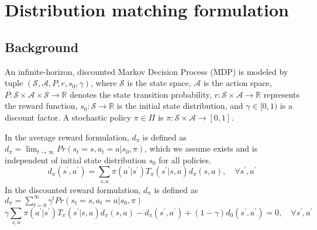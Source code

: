 \section{Distribution matching formulation}

\subsection{Background}
An infinite-horizon, discounted Markov Decision Process (MDP) is modeled by tuple $(\mathcal{S} , \mathcal{A}, P, r , s_0, \gamma)$, where $\mathcal{S}$ is the state space, $\mathcal{A}$ is the action space, $P:\mathcal{S}\times\mathcal{A}\times\mathcal{S}\rightarrow \mathbb{R}$ denotes the state transition probability, $r:\mathcal{S}\times\mathcal{A}\rightarrow\mathbb{R}$ represents the reward function, $s_0:\mathcal{S} \rightarrow\mathbb{R}$ is the initial state distribution, and $\gamma\in[0, 1)$ is a discount factor.
A stochastic policy $\pi\in\Pi$ is $\pi: \mathcal{S}\times\mathcal{A}\rightarrow [0, 1]$. 


In the average reward formulation, $d_\pi$ is defined as $d_{\pi}=\lim_{t\rightarrow\infty}Pr(s_t=s, a_t=a|s_0, \pi)$, which we assume exists and is independent of initial state distribution $s_0$ for all policies. 
\begin{equation*}\label{equ:average_reward}
d_{\pi}(s^\prime, a^\prime) = \sum_{s, a} \pi(a^\prime|s^\prime) T_{\pi}(s^\prime|s, a) d_{\pi}(s, a), \quad \forall s^\prime, a^\prime
\end{equation*}
In the discounted reward formulation, $d_\pi$ is defined as $d_{\pi}=\sum_{t=0}^{\infty}\gamma^t Pr(s_t=s, a_t=a|s_0, \pi)$
\begin{equation*}
\gamma \sum_{s, a}\pi(a^\prime|s^\prime) T_{\pi}(s^\prime |s, a) d_{\pi}(s, a) - d_{\pi}(s^\prime, a^\prime) + (1-\gamma)d_0(s^\prime, a^\prime) = 0, \quad \forall s^\prime, a^\prime
\end{equation*}


